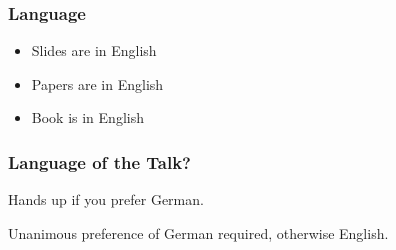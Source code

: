 \documentclass{beamer}
\date{2.3.2018}
\begin{document}
\renewcommand{\enquote}[1]{\emph{``#1''}} %

\begin{frame}
	\titlepage
	\doclicenseThis
\end{frame}

\begin{frame}
	\frametitle{Language}
	\begin{itemize}
		\item Slides are in English
		\item Papers are in English
		\item Book is in English
	\end{itemize}
\end{frame}

\begin{assignment}
	\frametitle{Language of the Talk?}
	\begin{task}
	Hands up if you prefer German.
	\end{task}
	Unanimous preference of German required, otherwise English.
\end{assignment}

\end{document}
